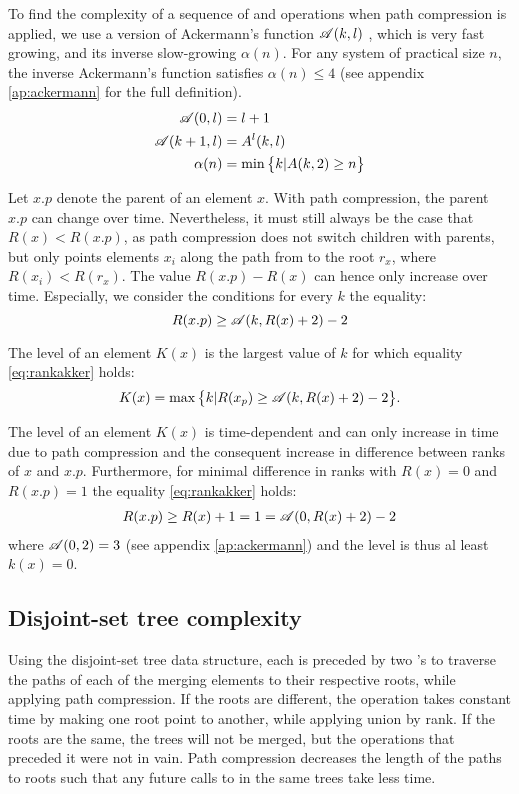 To find the complexity of a sequence of  and  operations when path compression is applied, we use a version of Ackermann's function $\mathscr{A}(k,l)$ \cite{ackermann1928hilbertschen, kozen1992design}, which is very fast growing, and its inverse slow-growing $\alpha(n)$. For any system of practical size $n$, the inverse Ackermann's function satisfies $\alpha(n)\leq 4$ (see appendix \ref{ap:ackermann} for the full definition). 
\begin{align}
  \nonumber \mathscr{A}(0,l) &= l + 1\\
  \mathscr{A}(k+1,l) &= A^l(k,l) \\
  \nonumber \alpha(n) &= \min\big\{k | A(k,2) \geq n \big\}
\end{align}

Let $x.p$ denote the parent of an element $x$. With path compression, the parent $x.p$ can change over time. Nevertheless, it must still always be the case that $R(x)<R(x.p)$, as path compression does not switch children with parents, but only points elements $x_i$ along the path from to the root $r_x$, where $R(x_i)<R(r_x)$. The value $R(x.p) - R(x)$ can hence only increase over time. Especially, we consider the conditions for every $k$ the equality:
\begin{equation}\label{eq:rankakker}
  R(x.p)\geq \mathscr{A}(k,R(x)+2)-2
\end{equation}
\begin{definition}
  The level of an element $K(x)$ is the largest value of $k$ for which equality \eqref{eq:rankakker} holds: 
  \begin{equation}
    K(x) = \max \big\{ k |  R(x_p)\geq \mathscr{A}(k,R(x)+2)-2\big\}.
  \end{equation}
\end{definition}
The level of an element $K(x)$ is time-dependent and can only increase in time due to path compression and the consequent increase in difference between ranks of $x$ and $x.p$. Furthermore, for minimal difference in ranks with $R(x) = 0$ and $R(x.p)=1$ the equality \eqref{eq:rankakker} holds:
\begin{eqnarray*}
  R(x.p) \geq R(x) + 1 = 1 = \mathscr{A}(0,R(x) + 2)-2
\end{eqnarray*}
where $\mathscr{A}(0,2)=3$ (see appendix \ref{ap:ackermann}) and the level is thus al least $k(x)=0$. 

\subsection{Disjoint-set tree complexity}
Using the disjoint-set tree data structure, each  is preceded by two 's to traverse the paths of each of the merging elements to their respective roots, while applying path compression. If the roots are different, the  operation takes constant time by making one root point to another, while applying union by rank. If the roots are the same, the trees will not be merged, but the  operations that preceded it were not in vain. Path compression decreases the length of the paths to roots such that any future calls to  in the same trees take less time.

